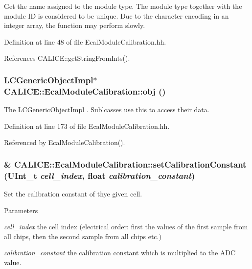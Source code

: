 Get the name assigned to the module type. The module type together with the module ID is considered to be unique. Due to the character encoding in an integer array, the function may perform slowly. 

Definition at line 48 of file EcalModuleCalibration.hh.

References CALICE::getStringFromInts().
\subsubsection[{obj}]{\setlength{\rightskip}{0pt plus 5cm}LCGenericObjectImpl$\ast$ CALICE::EcalModuleCalibration::obj ()\hspace{0.3cm}{\ttfamily  [inline]}}\label{classCALICE_1_1EcalModuleCalibration_aac8e0175e3d8f3b0a8508cae26ddf4a0}


The LCGenericObjectImpl . Sublcasses use this to access their data. 

Definition at line 173 of file EcalModuleCalibration.hh.

Referenced by EcalModuleCalibration().
\subsubsection[{setCalibrationConstant}]{\& CALICE::EcalModuleCalibration::setCalibrationConstant (UInt\_\-t {\em cell\_\-index}, \/  float {\em calibration\_\-constant})\hspace{0.3cm}{\ttfamily  [inline]}}\label{classCALICE_1_1EcalModuleCalibration_a6353a89b184f4594309e9506e4d25b19}


Set the calibration constant of thye given cell. 
\begin{DoxyParams}{Parameters}
\item[{\em cell\_\-index}]the cell index (electrical order: first the values of the first sample from all chips, then the second sample from all chips etc.) \item[{\em calibration\_\-constant}]the calibration constant which is multiplied to the ADC value. \end{DoxyParams}


